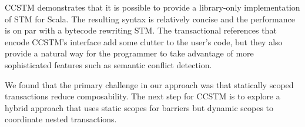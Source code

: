 
CCSTM demonstrates that it is possible to provide a library-only
implementation of STM for Scala.  The resulting
syntax is relatively concise and the performance is on par with a bytecode
rewriting STM.  The transactional references that encode CCSTM's interface
add some clutter to the user's code, but they also provide a natural way
for the programmer to take advantage of more sophisticated features such
as semantic conflict detection.

We found that the primary challenge in our approach was that statically
scoped transactions reduce composability.  The next step for CCSTM is
to explore a hybrid approach that uses static scopes for barriers but
dynamic scopes to coordinate nested transactions.

